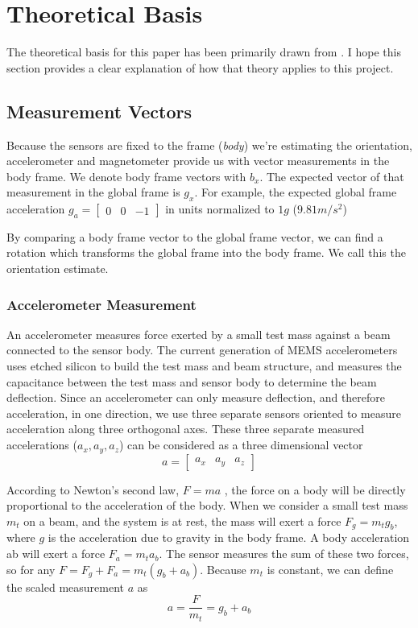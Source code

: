 \documentclass[12pt]{report}
\begin{document}
\section{Theoretical Basis}

The theoretical basis for this paper has been primarily drawn from \cite{choukroun04}. I hope this section provides a clear explanation of how that theory applies to this project.

\subsection{Measurement Vectors}
Because the sensors are fixed to the frame (\emph{body}) we're estimating the orientation, accelerometer and magnetometer provide us with vector measurements in the body frame. We denote body frame vectors with $b_x$. The expected vector of that measurement in the global frame is $g_x$. For example, the expected global frame acceleration $g_a = \begin{bmatrix} 0 & 0 & -1\end{bmatrix} $ in units normalized to $1g$ ($9.81m/s^2$)

By comparing a body frame vector to the global frame vector, we can find a rotation which transforms the global frame into the body frame. We call this the orientation estimate.  

\subsubsection{Accelerometer Measurement}

An accelerometer measures force exerted by a small test mass against a beam connected to the sensor body. The current generation of MEMS accelerometers uses etched silicon to build the test mass and beam structure, and measures the capacitance between the test mass and sensor body to determine the beam deflection. Since an accelerometer can only measure deflection, and therefore acceleration, in one direction, we use three separate sensors oriented to measure acceleration along three orthogonal axes. These three separate measured accelerations ($a_x, a_y, a_z$) can be considered as a three dimensional vector 
\begin{equation} \label{eq:defa}
  a = \begin{bmatrix}a_x&a_y&a_z \end{bmatrix}
\end{equation}

According to Newton's second law, $F = m a$ , the force on a body will be directly proportional to the acceleration of the body. When we consider a small test mass $m_t$ on a beam, and the system is at rest, the mass will exert a force $F_g = m_t g_b$, where $g$ is the acceleration due to gravity in the body frame. A body acceleration ab will exert a force $F_a = m_t a_b$. The sensor measures the sum of these two forces, so for any $F = F_g + F_a = m_t ( g_b + a_b )$. Because $m_t$ is constant, we can define the scaled measurement $a$ as 
\begin{equation} \label{eq:defza}
  a = \frac{F}{m_t} = g_b + a_b
\end{equation} 
 
\end{document}
